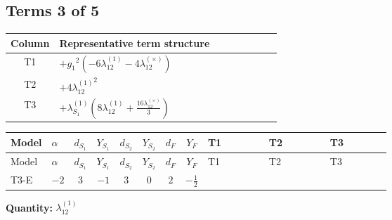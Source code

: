 \documentclass[8pt]{article}
\begin{document}
\begin{landscape}
\subsection*{Terms 3 of 5}
\begin{center}
\begin{tabular}{@{}c >{\raggedright\arraybackslash}p{0.82\linewidth}@{}}
\toprule
Column & Representative term structure \\
\midrule
T1 & \(\displaystyle +{g_1}^2 (-6 {\lambda_{12}^{(1)}}-4 {\lambda_{12}^{(\times)}})\) \\
\midrule
T2 & \(\displaystyle +4 {\lambda_{12}^{(1)}}^2\) \\
\midrule
T3 & \(\displaystyle +{\lambda_{S_1}^{(1)}} \left(8 {\lambda_{12}^{(1)}}+\frac{16 {\lambda_{12}^{(\times)}}}{3}\right)\) \\
\midrule
\bottomrule
\end{tabular}
\end{center}
\smallskip
\tiny
\begin{longtable}{@{}llcccccc >{\raggedright\arraybackslash}p{0.21\linewidth} >{\raggedright\arraybackslash}p{0.21\linewidth} >{\raggedright\arraybackslash}p{0.21\linewidth}@{}}
\toprule
Model & $\alpha$ & $d_{S_1}$ & $Y_{S_1}$ & $d_{S_2}$ & $Y_{S_2}$ & $d_F$ & $Y_F$ & T1 & T2 & T3 \\
\midrule
\endfirsthead
\toprule
Model & $\alpha$ & $d_{S_1}$ & $Y_{S_1}$ & $d_{S_2}$ & $Y_{S_2}$ & $d_F$ & $Y_F$ & T1 & T2 & T3 \\
\midrule
\endhead
T3-E & $-2$ & $3$ & $-1$ & $3$ & $0$ & $2$ & $-\frac{1}{2}$ & \scriptsize\adjustbox{max width=\linewidth}{$\begin{gathered} +{g_1}^2 (-6 {\lambda_{12}^{(1)}}-4 {\lambda_{12}^{(\times)}})\end{gathered}$} & \scriptsize\adjustbox{max width=\linewidth}{$\begin{gathered} +4 {\lambda_{12}^{(1)}}^2\end{gathered}$} & \scriptsize\adjustbox{max width=\linewidth}{$\begin{gathered} +{\lambda_{S_1}^{(1)}} \left(8 {\lambda_{12}^{(1)}}+\frac{16 {\lambda_{12}^{(\times)}}}{3}\right)\end{gathered}$} \\
\midrule
\bottomrule
\end{longtable}
\clearpage
\noindent\textbf{Quantity: }$\lambda_{12}^{(1)}$\par\smallskip

\end{landscape}
\end{document}
